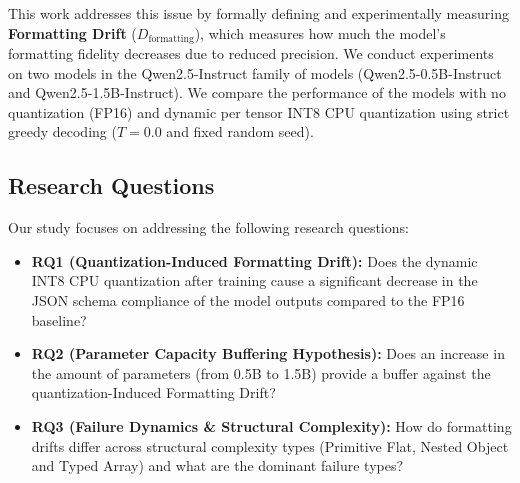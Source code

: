 \documentclass[10pt,journal,compsoc]{IEEEtran}
\begin{document}
This work addresses this issue by formally defining and experimentally measuring \textbf{Formatting Drift} ($D_{\text{formatting}}$), which measures how much the model's formatting fidelity decreases due to reduced precision. We conduct experiments on two models in the Qwen2.5-Instruct family of models \cite{qwen2024qwen25} (Qwen2.5-0.5B-Instruct and Qwen2.5-1.5B-Instruct). We compare the performance of the models with no quantization (FP16) and dynamic per tensor INT8 CPU quantization using strict greedy decoding ($T=0.0$ and fixed random seed).

\subsection{Research Questions}
Our study focuses on addressing the following research questions:
\begin{itemize}
\item \textbf{RQ1 (Quantization-Induced Formatting Drift):} Does the dynamic INT8 CPU quantization after training cause a significant decrease in the JSON schema compliance of the model outputs compared to the FP16 baseline?
\item \textbf{RQ2 (Parameter Capacity Buffering Hypothesis):} Does an increase in the amount of parameters (from 0.5B to 1.5B) provide a buffer against the quantization-Induced Formatting Drift?
\item \textbf{RQ3 (Failure Dynamics \& Structural Complexity):} How do formatting drifts differ across structural complexity types (Primitive Flat, Nested Object and Typed Array) and what are the dominant failure types?
\end{itemize}
\end{document}
